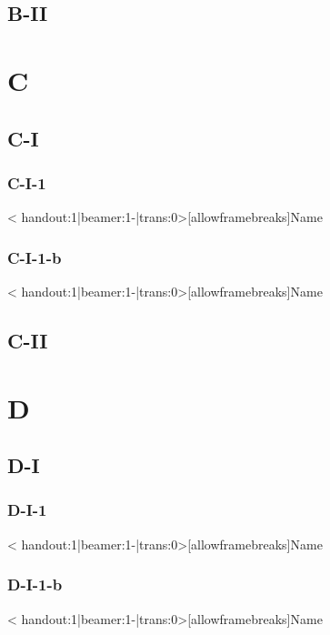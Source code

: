 \documentclass{beamer}[10]
\begin{document}
    \subsection{B-II}

\section{C}
    \subsection{C-I}
        \subsubsection{C-I-1}
                    \begin{frame}< handout:1|beamer:1-|trans:0>[allowframebreaks]{Name}{\subsubsecname}	\end{frame}
        \subsubsection{C-I-1-b}
                    \begin{frame}< handout:1|beamer:1-|trans:0>[allowframebreaks]{Name}{\subsubsecname}	\end{frame}
    \subsection{C-II}

\section{D}
    \subsection{D-I}
        \subsubsection{D-I-1}
                    \begin{frame}< handout:1|beamer:1-|trans:0>[allowframebreaks]{Name}{\subsubsecname}	\end{frame}
        \subsubsection{D-I-1-b}
                    \begin{frame}< handout:1|beamer:1-|trans:0>[allowframebreaks]{Name}{\subsubsecname}	\end{frame}
\end{document}
